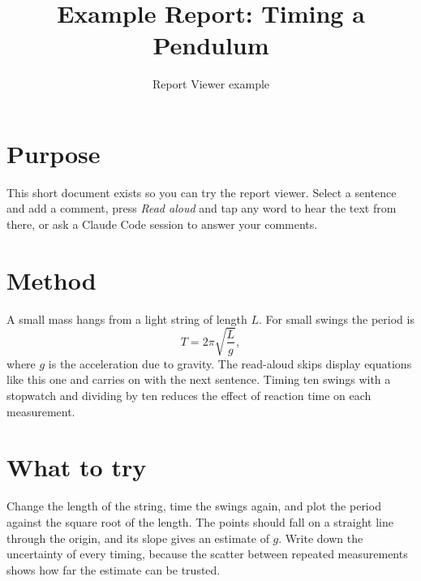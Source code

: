 \documentclass[11pt]{article}
\title{Example Report: Timing a Pendulum}
\author{Report Viewer example}
\date{}
\begin{document}
\maketitle

\section{Purpose}
This short document exists so you can try the report viewer. Select a sentence and add a comment, press
\emph{Read aloud} and tap any word to hear the text from there, or ask a Claude Code session to answer your comments.

\section{Method}
A small mass hangs from a light string of length $L$. For small swings the period is
\begin{equation}
  T = 2\pi\sqrt{\frac{L}{g}},
\end{equation}
where $g$ is the acceleration due to gravity. The read-aloud skips display equations like this one and carries
on with the next sentence. Timing ten swings with a stopwatch and dividing by ten reduces the effect of reaction
time on each measurement.

\section{What to try}
Change the length of the string, time the swings again, and plot the period against the square root of the
length. The points should fall on a straight line through the origin, and its slope gives an estimate of $g$.
Write down the uncertainty of every timing, because the scatter between repeated measurements shows how far
the estimate can be trusted.
\end{document}
